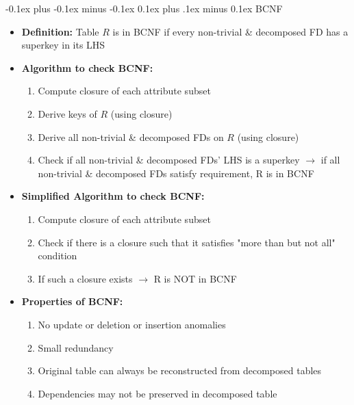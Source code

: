 \documentclass[landscape]{article}
\makeatletter
\renewcommand{\subsection}{\@startsection{subsection}{2}{0mm}%
  {-0.1ex plus -0.1ex minus -0.1ex}%
  {0.1ex plus .1ex minus 0.1ex}%
{\normalfont\scriptsize\bfseries}}
\makeatother
\begin{document}
\begin{multicols*}{5}
    \subsection{BCNF}
    \begin{itemize}
      \item \textbf{Definition:} Table $R$ is in BCNF if every non-trivial \& decomposed FD has a superkey in its LHS
      \item \textbf{Algorithm to check BCNF:}
      \begin{enumerate}
        \item Compute closure of each attribute subset
        \item Derive keys of $R$ (using closure)
        \item Derive all non-trivial \& decomposed FDs on $R$ (using closure)
        \item Check if all non-trivial \& decomposed FDs' LHS is a superkey $\rightarrow$ if all non-trivial \& decomposed FDs satisfy requirement, R is in BCNF
      \end{enumerate}
      \item \textbf{Simplified Algorithm to check BCNF:}
      \begin{enumerate}
        \item Compute closure of each attribute subset
        \item Check if there is a closure such that it satisfies "more than but not all" condition
        \item If such a closure exists $\rightarrow$ R is NOT in BCNF
      \end{enumerate}
      \item \textbf{Properties of BCNF:}
      \begin{enumerate}
        \item No update or deletion or insertion anomalies
        \item Small redundancy
        \item Original table can always be reconstructed from decomposed tables
        \item Dependencies may not be preserved in decomposed table
      \end{enumerate}
    \end{itemize}


\end{multicols*}
\end{document}
